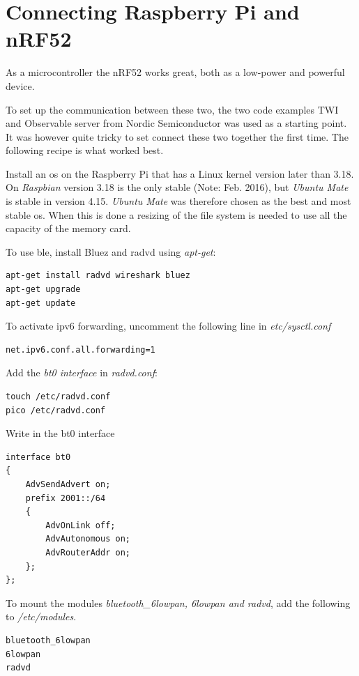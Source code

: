 \section{Connecting Raspberry Pi and nRF52}


As a microcontroller the nRF52 works great, both as a low-power and powerful device. 

To set up the communication between these two, the two code examples TWI and Observable server from Nordic Semiconductor was used as a starting point. It was however quite tricky to set connect these two together the first time. The following recipe is what worked best. 

Install an \gls{os} on the Raspberry Pi that has a Linux kernel version later than 3.18. On \textit{Raspbian} version 3.18 is the only stable (Note: Feb. 2016), but \textit{Ubuntu Mate} is stable in version 4.15. \textit{Ubuntu Mate} was therefore chosen as the best and most stable \gls{os}. When this is done a resizing of the file system is needed to use all the capacity of the memory card. 

To use \gls{ble}, install Bluez and radvd using \textit{apt-get}:

\begin{lstlisting}
apt-get install radvd wireshark bluez
apt-get upgrade
apt-get update
\end{lstlisting}

To activate \gls{ipv6} forwarding, uncomment the following line in \textit{etc/sysctl.conf}

\begin{verbatim}
net.ipv6.conf.all.forwarding=1
\end{verbatim}

Add the \textit{bt0 interface} in \textit{radvd.conf}:

\begin{verbatim}
touch /etc/radvd.conf
pico /etc/radvd.conf
\end{verbatim} 

Write in the bt0 interface

\begin{verbatim}
interface bt0
{
    AdvSendAdvert on;
    prefix 2001::/64
    {
        AdvOnLink off;
        AdvAutonomous on;
        AdvRouterAddr on;
    };
};
\end{verbatim} 

To mount the modules \textit{bluetooth\_6lowpan, 6lowpan and radvd}, add the following to \textit{/etc/modules}. 

\begin{verbatim}
bluetooth_6lowpan
6lowpan
radvd
\end{verbatim}

